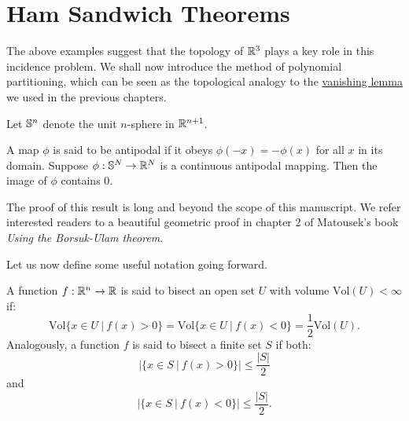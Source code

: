 \section{Ham Sandwich Theorems}
The above examples suggest that the topology of $\mathbb R^3$ plays a key role in this incidence problem. We shall now introduce the method of polynomial partitioning,
which can be seen as the topological analogy to the \hyperref[lem:kaklem2]{vanishing lemma} we used in the previous chapters. 

Let $\mathbb S^n$ denote the unit $n$-sphere in $\mathbb R^{n+1}$. 
\begin{theorem}
    A map $\phi$ is said to be antipodal if it obeys $\phi (-x) = -\phi(x)$ for all $x$ in its domain. Suppose $\phi: \mathbb S^N \to \mathbb R^N$ is a continuous antipodal mapping. 
    Then the image of $\phi$ contains 0. \label{thm:Borsuk-Ulam}
\end{theorem}
The proof of this result is long and beyond the scope of this manuscript.
 We refer interested readers to a beautiful geometric proof in chapter 2 of Matousek's book \textit{Using the Borsuk-Ulam theorem}.\cite{matouvsek2003using}

Let us now define some useful notation going forward. 
\begin{definition}
A function $f :\mathbb R^n \to \mathbb R$ is said to bisect an open set $U$ with volume $\text{Vol}(U) < \infty$ if:
\[
    \text{Vol}\{x \in U \ | \ f(x) > 0 \} = \text{Vol}\{x \in U \ | \ f(x) < 0 \} = \frac{1}{2} \text{Vol}(U).
\]
Analogously, a function $f$ is said to bisect a finite set $S$ if both:
\[
  |\{x \in S \ | \ f(x) > 0\}| \leq \frac{|S|}{2}   
\]
and 
\[
  |\{x \in S \ | \ f(x) < 0\}| \leq \frac{|S|}{2}.
\]

\end{definition}



